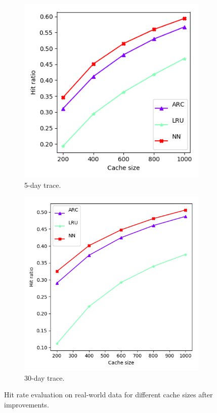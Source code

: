 \begin{figure}[h!]
	\centering
	\captionsetup{justification=centering}
	\begin{subfigure}[b]{0.49\linewidth}
		\includegraphics[width=\linewidth]{pics/cache4.png}
		\caption{5-day trace.}
	\end{subfigure}
	\begin{subfigure}[b]{0.49\linewidth}
		\includegraphics[width=\linewidth]{pics/cache4_2.png}
		\caption{30-day trace.}
	\end{subfigure}
	\caption{Hit rate evaluation on real-world data for different cache sizes after improvements.}
	\label{fig:cache4}
\end{figure}

